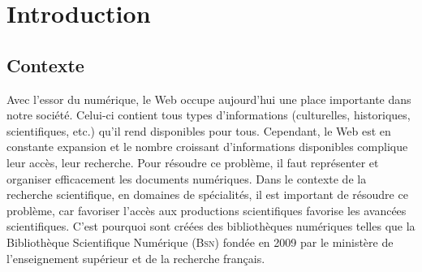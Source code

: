 \chapter{Introduction}
\label{chap:main-introduction}


  \section{Contexte}
  \label{sec:main-introduction-context}
    Avec l'essor du numérique, le Web occupe aujourd'hui une place importante
    dans notre société. Celui-ci contient tous types d'informations
    (culturelles, historiques, scientifiques, etc.) qu'il rend disponibles pour
    tous. Cependant, le Web est en constante expansion et le nombre croissant
    d'informations disponibles complique leur accès, leur recherche. Pour
    résoudre ce problème, il faut représenter et organiser efficacement les
    documents numériques. Dans le contexte de la recherche scientifique, en
    domaines de spécialités, il est important de résoudre ce problème, car
    favoriser l'accès aux productions scientifiques favorise les avancées
    scientifiques. C'est pourquoi sont créées des bibliothèques numériques
    telles que la Bibliothèque Scientifique Numérique (\textsc{Bsn}) fondée en
    2009 par le ministère de l'enseignement supérieur et de la recherche
    français.

